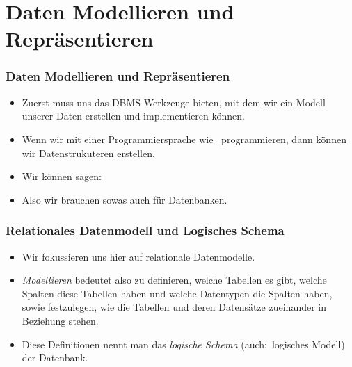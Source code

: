 \documentclass[aspectratio=169,mathserif,notheorems]{beamer}%
\begin{document}
\section{Daten Modellieren und Repräsentieren}%
%
\begin{frame}%
\frametitle{Daten Modellieren und Repräsentieren}%
\begin{itemize}%
\item Zuerst muss uns das DBMS Werkzeuge bieten, mit dem wir ein Modell unserer Daten erstellen und implementieren können.%
\item<2-> Wenn wir mit einer Programmiersprache wie \python\ programmieren, dann können wir Datenstrukuteren erstellen.
\item<3-> Wir können sagen:~%
\item<4-> Also wir brauchen sowas auch für Datenbanken.%
\end{itemize}%
\end{frame}%
%
\begin{frame}%
\frametitle{Relationales Datenmodell und Logisches Schema}%
\begin{itemize}%
\item Wir fokussieren uns hier auf relationale Datenmodelle.%
\item<2-> \emph{Modellieren} bedeutet also zu definieren, welche Tabellen es gibt, welche Spalten diese Tabellen haben und welche Datentypen die Spalten haben, sowie festzulegen, wie die Tabellen und deren Datensätze zueinander in Beziehung stehen.%
\item<3-> Diese Definitionen nennt man das \emph{logische Schema} (auch:~logisches Modell) der Datenbank.%
\end{itemize}%
\end{frame}%
%
\end{document}
